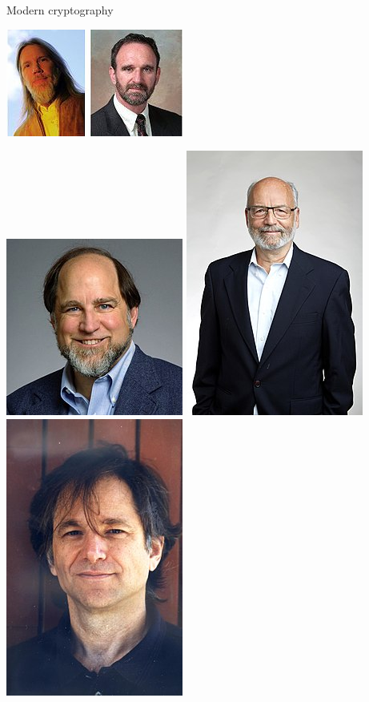 \documentclass{beamer}
\begin{document}
\begin{frame}{Modern cryptography}
    \begin{center}
    \begin{minipage}{0.45\linewidth}
        \includegraphics[width=0.7\linewidth]{fig/220px-Diffie_and_Hellman.jpg}
    \end{minipage}
    \hfill
    \begin{minipage}{0.5\linewidth}
        \includegraphics[width=0.3\linewidth]{fig/Ronald_L_Rivest_photo.jpg}
        \includegraphics[width=0.33\linewidth]{fig/Adi_Shamir_Royal_Society.jpg}
        \includegraphics[width=0.33\linewidth]{fig/Len-mankin-pic.jpg}

\end{minipage}
\end{center}
\end{frame}
\end{document}
